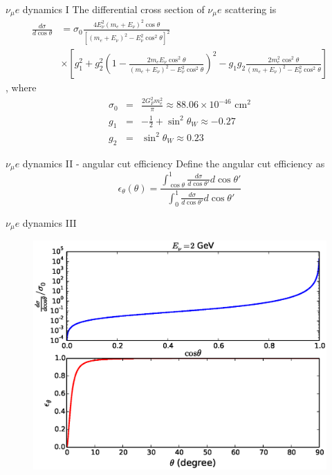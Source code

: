 \documentclass{beamer}
\begin{document}
\begin{frame}{$\nu_\mu e$ dynamics I}
\tiny
The differential cross section of $\nu_\mu e$ scattering is\footnotemark
\begin{equation}
  \begin{aligned}
  \frac{d\sigma}{d\cos\theta} & = \sigma_0 \frac{4E_\nu^2(m_e+E_\nu)^2\cos\theta}{\left[ (m_e+E_\nu)^2-E_\nu^2\cos^2\theta \right]^2} \\
  & \times \left[ g_1^2 + g_2^2\left( 1-\frac{2m_eE_\nu\cos^2\theta}{(m_e+E_\nu)^2-E_\nu^2\cos^2\theta} \right)^2 -g_1g_2
  \frac{2m_e^2\cos^2\theta}{(m_e+E_\nu)^2-E^2_\nu\cos^2\theta} \right]
  \end{aligned}
\end{equation}
, where
\begin{eqnarray*}
  \sigma_0 &=& \frac{2G_F^2m_e^2}{\pi}\approx 88.06\times 10^{-46} \text{ cm}^2 \\
  g_1 &=& -\frac{1}{2}+\sin^2\theta_W \approx -0.27 \\
  g_2 &=& \sin^2\theta_W \approx 0.23
\end{eqnarray*}
\end{frame}

\begin{frame}{$\nu_\mu e$ dynamics II - angular cut efficiency}
Define the angular cut efficiency as
  \begin{equation}
    \epsilon_\theta(\theta)=\frac{\int_{\cos\theta}^1 \frac{d\sigma}{d\cos\theta'}d\cos\theta'}{\int_0^1 \frac{d\sigma}{d\cos\theta'}d\cos\theta'}
  \end{equation}
\end{frame}

\begin{frame}{$\nu_\mu e$ dynamics III}
\begin{figure}
\centering
  \includegraphics[width=.9\textwidth]{figures/xsec_cut_eff.eps}
\end{figure}
\end{frame}
\end{document}
